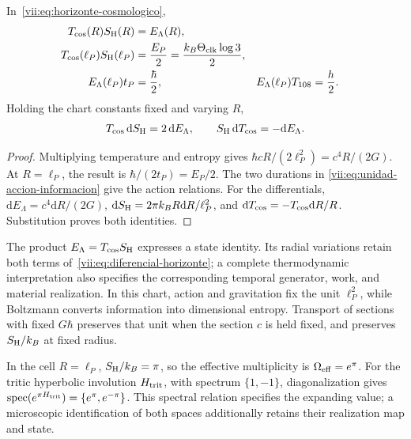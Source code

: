 \begin{theorem}
\label{vii:thm:celda-media-accion}
In~\eqref{vii:eq:horizonte-cosmologico},
\begin{align}
 T_{\rm cos}(R)S_{\rm H}(R)&=E_\Lambda(R),\\
 T_{\rm cos}(\ell_P)S_{\rm H}(\ell_P)
 &=\frac{E_P}{2}=\frac{k_B\Theta_{\rm clk}\log3}{2},\\
 E_\Lambda(\ell_P)t_P&=\frac{\hbar}{2},&
 E_\Lambda(\ell_P)T_{108}&=\frac h2.
 \label{vii:eq:media-accion-horizonte}
\end{align}
Holding the chart constants fixed and varying \(R\),
\begin{equation}
 T_{\rm cos}\,\mathrm dS_{\rm H}=2\,\mathrm dE_\Lambda,
 \qquad S_{\rm H}\,\mathrm dT_{\rm cos}=-\mathrm dE_\Lambda.
 \label{vii:eq:diferencial-horizonte}
\end{equation}
\end{theorem}
\begin{proof}
Multiplying temperature and entropy gives
\(\hbar cR/(2\ell_P^2)=c^4R/(2G)\).
At \(R=\ell_P\), the result is
\(\hbar/(2t_P)=E_P/2\). The two durations in
\eqref{vii:eq:unidad-accion-informacion} give the action relations.
For the differentials,
\(\mathrm dE_\Lambda=c^4\mathrm dR/(2G)\),
\(\mathrm dS_{\rm H}=2\pi k_BR\mathrm dR/\ell_P^2\), and
\(\mathrm dT_{\rm cos}=-T_{\rm cos}\mathrm dR/R\).
Substitution proves both identities.
\end{proof}

The product \(E_\Lambda=T_{\rm cos}S_{\rm H}\) expresses a
state identity. Its radial variations retain both terms
of~\eqref{vii:eq:diferencial-horizonte}; a complete thermodynamic interpretation
also specifies the corresponding temporal generator, work, and
material realization. In this chart, action and
gravitation fix the unit \(\ell_P^2\), while Boltzmann converts
information into dimensional entropy. Transport of sections with
fixed \(G\hbar\) preserves that unit when the section \(c\) is
held fixed, and preserves \(S_{\rm H}/k_B\) at fixed radius.

In the cell \(R=\ell_P\), \(S_{\rm H}/k_B=\pi\), so
the effective multiplicity is \(\Omega_{\rm eff}=e^\pi\).
For the tritic hyperbolic involution \(H_{\rm trit}\), with spectrum
\(\{1,-1\}\), diagonalization gives
\(\operatorname{spec}(e^{\pi H_{\rm trit}})=\{e^\pi,e^{-\pi}\}\).
This spectral relation specifies the expanding value; a microscopic
identification of both spaces additionally retains their realization
map and state.

